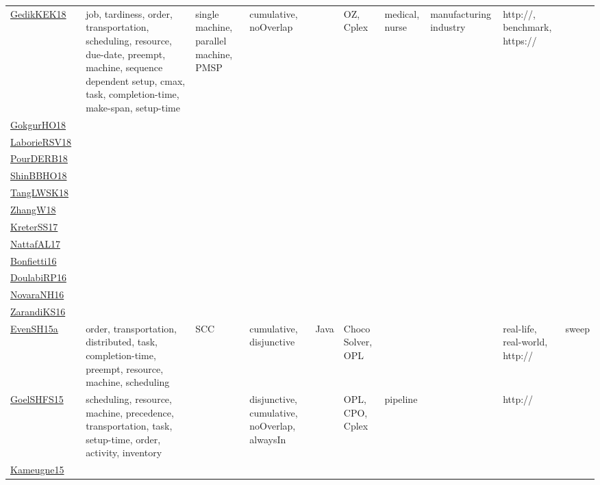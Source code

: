 {\begin{longtable}{p{3cm}p{4cm}p{2cm}p{2cm}p{2cm}p{2cm}p{2cm}p{2cm}p{2cm}p{2cm}}
\href{articles/GedikKEK18.pdf}{GedikKEK18}~\cite{GedikKEK18} & job, tardiness, order, transportation, scheduling, resource, due-date, preempt, machine, sequence dependent setup, cmax, task, completion-time, make-span, setup-time & single machine, parallel machine, PMSP & cumulative, noOverlap &  & OZ, Cplex & medical, nurse & manufacturing industry & http://, benchmark, https:// & \\
\href{}{GokgurHO18}~\cite{GokgurHO18} &  &  &  &  &  &  &  &  & \\
\href{articles/LaborieRSV18.pdf}{LaborieRSV18}~\cite{LaborieRSV18} &  &  &  &  &  &  &  &  & \\
\href{articles/PourDERB18.pdf}{PourDERB18}~\cite{PourDERB18} &  &  &  &  &  &  &  &  & \\
\href{articles/ShinBBHO18.pdf}{ShinBBHO18}~\cite{ShinBBHO18} &  &  &  &  &  &  &  &  & \\
\href{}{TangLWSK18}~\cite{TangLWSK18} &  &  &  &  &  &  &  &  & \\
\href{articles/ZhangW18.pdf}{ZhangW18}~\cite{ZhangW18} &  &  &  &  &  &  &  &  & \\
\href{articles/KreterSS17.pdf}{KreterSS17}~\cite{KreterSS17} &  &  &  &  &  &  &  &  & \\
\href{articles/NattafAL17.pdf}{NattafAL17}~\cite{NattafAL17} &  &  &  &  &  &  &  &  & \\
\href{}{Bonfietti16}~\cite{Bonfietti16} &  &  &  &  &  &  &  &  & \\
\href{}{DoulabiRP16}~\cite{DoulabiRP16} &  &  &  &  &  &  &  &  & \\
\href{articles/NovaraNH16.pdf}{NovaraNH16}~\cite{NovaraNH16} &  &  &  &  &  &  &  &  & \\
\href{articles/ZarandiKS16.pdf}{ZarandiKS16}~\cite{ZarandiKS16} &  &  &  &  &  &  &  &  & \\
\href{articles/EvenSH15a.pdf}{EvenSH15a}~\cite{EvenSH15a} & order, transportation, distributed, task, completion-time, preempt, resource, machine, scheduling & SCC & cumulative, disjunctive & Java & Choco Solver, OPL &  &  & real-life, real-world, http:// & sweep\\
\href{articles/GoelSHFS15.pdf}{GoelSHFS15}~\cite{GoelSHFS15} & scheduling, resource, machine, precedence, transportation, task, setup-time, order, activity, inventory &  & disjunctive, cumulative, noOverlap, alwaysIn &  & OPL, CPO, Cplex & pipeline &  & http:// & \\
\href{articles/Kameugne15.pdf}{Kameugne15}~\cite{Kameugne15} &  &  &  &  &  &  &  &  & \\

\end{longtable}}
